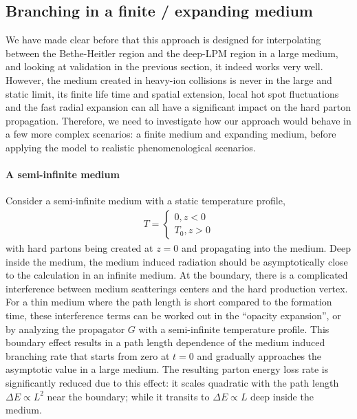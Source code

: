 \subsection{Branching in a finite / expanding medium}
We have made clear before that this approach is designed for interpolating between the Bethe-Heitler region and the deep-LPM region in a large medium, and looking at validation in the previous section, it indeed works very well.
However, the medium created in heavy-ion collisions is never in the large and static limit, its finite life time and spatial extension, local hot spot fluctuations and the fast radial expansion can all have a significant impact on the hard parton propagation. 
Therefore, we need to investigate how our approach would behave in a few more complex scenarios: a finite medium and expanding medium, before applying the model to realistic phenomenological scenarios.

\paragraph{A semi-infinite medium}
Consider a semi-infinite medium with a static temperature profile,
\begin{eqnarray}
T = \begin{cases}
0 , z<0\\
T_0, z>0
\end{cases}
\end{eqnarray}
with hard partons being created at $z=0$ and propagating into the medium.
Deep inside the medium, the medium induced radiation should be asymptotically close to the calculation in an infinite medium.
At the boundary, there is a complicated interference between medium scatterings centers and the hard production vertex.
For a thin medium where the path length is short compared to the formation time, these interference terms can be worked out in the ``opacity expansion'', or by analyzing the propagator $G$ with a semi-infinite temperature profile.
This boundary effect results in a path length dependence of the medium induced branching rate that starts from zero at $t=0$ and gradually approaches the asymptotic value in a large medium.
The resulting parton energy loss rate is significantly reduced due to this effect: it scales quadratic with the path length $\Delta E \propto L^2$ near the boundary; while it transits to $\Delta E \propto L$ deep inside the medium.

